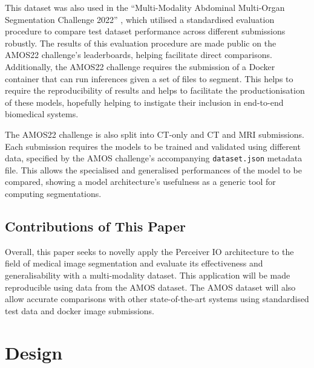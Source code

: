 \documentclass{l4proj}
\begin{document}
This dataset was also used in the “Multi-Modality Abdominal Multi-Organ Segmentation Challenge 2022” \citep{ji2022amos}, which utilised a standardised evaluation procedure to compare test dataset performance across different submissions robustly. The results of this evaluation procedure are made public on the AMOS22 challenge’s leaderboards, helping facilitate direct comparisons. Additionally, the AMOS22 challenge requires the submission of a Docker container that can run inferences given a set of files to segment. This helps to require the reproducibility of results and helps to facilitate the productionisation of these models, hopefully helping to instigate their inclusion in end-to-end biomedical systems.

The AMOS22 challenge is also split into CT-only and CT and MRI submissions. Each submission requires the models to be trained and validated using different data, specified by the AMOS challenge’s accompanying \lstinline{dataset.json} metadata file. This allows the specialised and generalised performances of the model to be compared, showing a model architecture's usefulness as a generic tool for computing segmentations.

\section{Contributions of This Paper}

Overall, this paper seeks to novelly apply the Perceiver IO architecture to the field of medical image segmentation and evaluate its effectiveness and generalisability with a multi-modality dataset. This application will be made reproducible using data from the AMOS dataset. The AMOS dataset will also allow accurate comparisons with other state-of-the-art systems using standardised test data and docker image submissions.

\chapter{Design} \label{chap:design}
\end{document}
